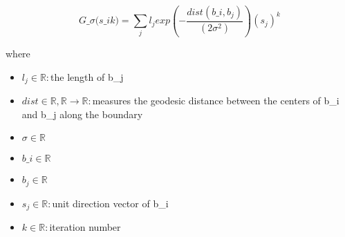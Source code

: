 \documentclass[12pt]{article}
\begin{document}
\[
\textit{G\_σ(s\_i\^k)} = \sum_\textit{j} \textit{l}_{ \textit{j} }exp(-\frac{\textit{dist}(\textit{b\_i},\textit{b}_{ \textit{j} })}{(2\textit{σ}^{2})})(\textit{s}_{ \textit{j} })^{\textit{k}}
\]

where
\begin{itemize}
\item $\textit{l}_{\textit{j}} \in \mathbb{{R}}:$the length of b_j
\item $\textit{dist} \in \mathbb{{R}},\mathbb{{R}}\rightarrow \mathbb{{R}}:$measures the geodesic distance between the centers of b_i and b_j along the boundary
\item $\textit{σ} \in \mathbb{{R}}$
\item $\textit{b\_i} \in \mathbb{{R}}$
\item $\textit{b}_{\textit{j}} \in \mathbb{{R}}$
\item $\textit{s}_{\textit{j}} \in \mathbb{{R}}:$unit direction vector of b_i
\item $\textit{k} \in \mathbb{{R}}:$iteration number
\end{itemize}
\end{document}
